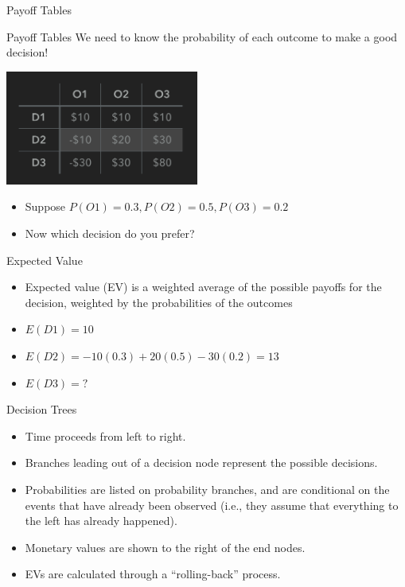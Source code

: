 \documentclass{beamer}\usepackage[]{graphicx}\usepackage[]{color}
\begin{document}
\begin{darkframes}
\begin{frame}[fragile]{Payoff Tables}
      \lc %
    \end{frame}


    \begin{frame}[fragile]{Payoff Tables}
      We need to know the probability of each outcome to make a good decision!
      \begin{center}
        \includegraphics[width=2.5in]{PayoffTable} 
      \end{center}
        \begin{itemize}
            \item Suppose $P(O1) = 0.3, P(O2) = 0.5, P(O3) = 0.2$
            \item Now which decision do you prefer?
        \end{itemize}

    \end{frame}


    \begin{frame}[fragile]{Expected Value}
         \begin{itemize}[<+->]
            \item Expected value (EV) is a weighted average of the possible payoffs for the decision,
            weighted by the probabilities of the outcomes
            \item $E(D1) = 10$
            \item $E(D2) = -10(0.3) + 20(0.5) - 30(0.2) = 13$
            \item $E(D3) = ?$
        \end{itemize}    

      \lc %
    \end{frame}


    \begin{frame}[fragile]{Decision Trees}
          \begin{itemize}
            \item Time proceeds from left to right.
            \item Branches leading out of a decision node represent the possible decisions.
            \item Probabilities are listed on probability branches, and are conditional on the events that have already been observed (i.e., they assume that everything to the left has already happened).
            \item Monetary values are shown to the right of the end nodes.
            \item EVs are calculated through a ``rolling-back'' process.
          \end{itemize}  
    \end{frame}



\end{darkframes}
\end{document}
